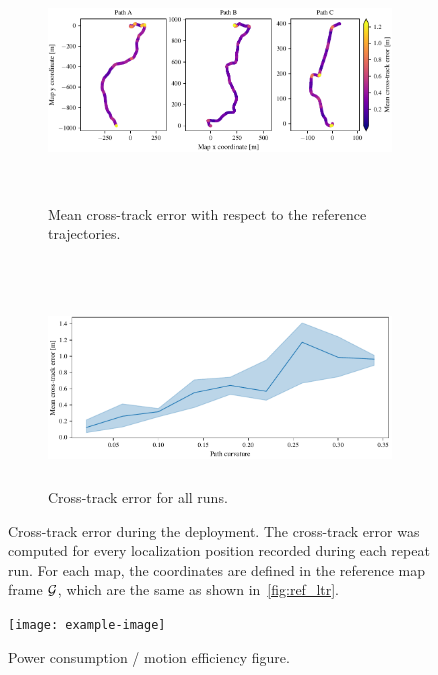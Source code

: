 \begin{figure}[htpb]
	\begin{center}
		\begin{subfigure}[b]{\textwidth}
			\centering
			\includegraphics[height=2.5in]{figs/ref_traj_errors.pdf}
			\caption{Mean cross-track error with respect to the reference trajectories.}
			\label{fig:pf_error_traj}
		\end{subfigure}
		\\
		\begin{subfigure}[b]{\textwidth}
			\centering
			\includegraphics[height=2.0in]{figs/cur_vs_crosstrack.pdf}
			\caption{Cross-track error for all runs.}
			\label{fig:pf_error_runs}
		\end{subfigure}
		\caption{Cross-track error during the deployment.
		The cross-track error was computed for every localization position recorded during each repeat run.
		For each map, the coordinates are defined in the reference map frame $\mathcal{G}$, which are the same as shown in~\autoref{fig:ref_ltr}.} 
		\label{fig:pf_error}
	\end{center}
\end{figure}


\begin{figure} [htpb]
	\centering
	\texttt{[image: example-image]}
	\caption{Power consumption / motion efficiency figure.}
	\label{fig:moiton_power}
\end{figure}


